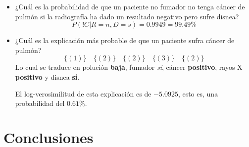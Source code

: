 \documentclass[a4paper]{article}
\begin{document}
\begin{itemize} 
\item ¿Cuál es la probabilidad de que un paciente no fumador no tenga cáncer de pulmón si la radiografía ha dado un resultado negativo pero sufre disnea?
\[ P \left( !C | R = n, D = s \right) = 0.9949 = 99.49\% \]
\item ¿Cuál es la explicación más probable de que un paciente sufra cáncer de pulmón?
\[ \lbrace \left( 1 \right) \rbrace \quad \lbrace \left( 2 \right) \rbrace \quad \lbrace \left( 2 \right) \rbrace \quad \lbrace \left( 3 \right) \rbrace \quad \lbrace \left( 2 \right) \rbrace \]
Lo cual se traduce en polución \textbf{baja}, fumador \textit{sí}, cáncer \textbf{positivo}, rayos X \textbf{positivo} y disnea \textbf{sí}.

El log-verosimilitud de esta explicación es de $-5.0925$, esto es, una probabilidad del $0.61\%$.
\end{itemize}

\section{Conclusiones}
\quad 
\end{document}
